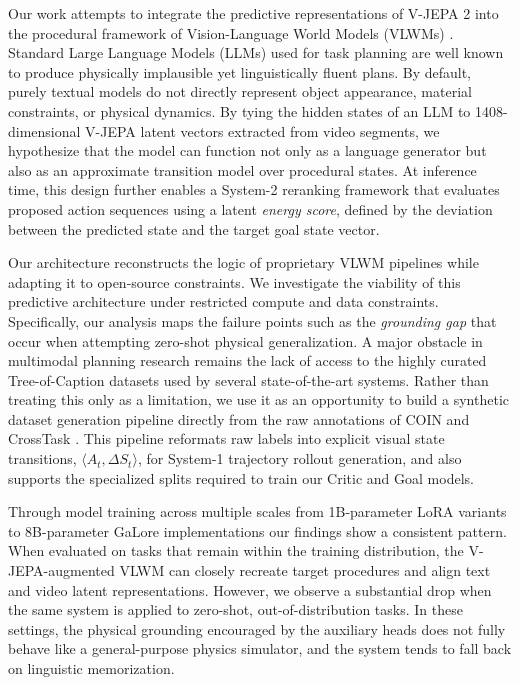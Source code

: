 \documentclass{article}
\begin{document}
Our work attempts to integrate the predictive representations of V-JEPA 2 \citep{assran2025vjepa2} into the procedural framework of Vision-Language World Models (VLWMs) \citep{chen2025planning}. Standard Large Language Models (LLMs) used for task planning are well known to produce physically implausible yet linguistically fluent plans. By default, purely textual models do not directly represent object appearance, material constraints, or physical dynamics. By tying the hidden states of an LLM to 1408-dimensional V-JEPA latent vectors extracted from video segments, we hypothesize that the model can function not only as a language generator but also as an approximate transition model over procedural states. At inference time, this design further enables a System-2 reranking framework that evaluates proposed action sequences using a latent \textit{energy score}, defined by the deviation between the predicted state and the target goal state vector.

Our architecture reconstructs the logic of proprietary VLWM pipelines while adapting it to open-source constraints. We investigate the viability of this predictive architecture under restricted compute and data constraints. Specifically, our analysis maps the failure points such as the \textit{grounding gap} that occur when attempting zero-shot physical generalization. A major obstacle in multimodal planning research remains the lack of access to the highly curated Tree-of-Caption datasets used by several state-of-the-art systems. Rather than treating this only as a limitation, we use it as an opportunity to build a synthetic dataset generation pipeline directly from the raw annotations of COIN \citep{tang2019coin} and CrossTask \citep{zhukov2019crossTask}. This pipeline reformats raw labels into explicit visual state transitions, $\langle A_t, \Delta S_t \rangle$, for System-1 trajectory rollout generation, and also supports the specialized splits required to train our Critic and Goal models.

Through model training across multiple scales from 1B-parameter LoRA variants to 8B-parameter GaLore implementations our findings show a consistent pattern. When evaluated on tasks that remain within the training distribution, the V-JEPA-augmented VLWM can closely recreate target procedures and align text and video latent representations. However, we observe a substantial drop when the same system is applied to zero-shot, out-of-distribution tasks. In these settings, the physical grounding encouraged by the auxiliary heads does not fully behave like a general-purpose physics simulator, and the system tends to fall back on linguistic memorization.
\end{document}
